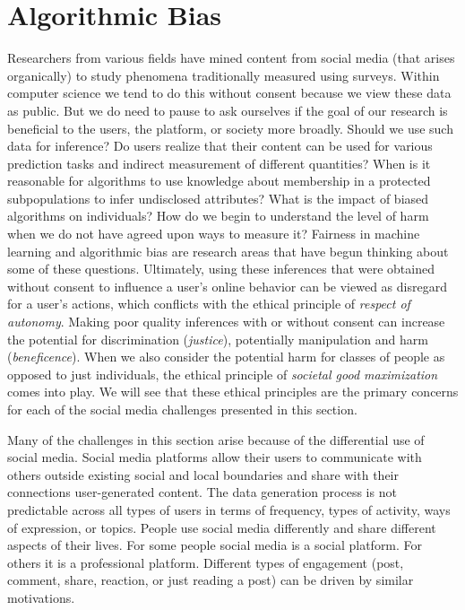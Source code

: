 \documentclass[11pt]{article} %
\begin{document}
\section{Algorithmic Bias}
\label{sec:bias} 

Researchers from various fields have mined content from social media (that arises organically) to study phenomena traditionally measured using surveys. Within computer science we tend to do this without consent because we view these data as public. But we do need to pause to ask ourselves if the goal of our research is beneficial to the users, the platform, or society more broadly. Should we use such data for inference? Do users realize that their content can be used for various prediction tasks and indirect measurement of different quantities? When is it reasonable for algorithms to use knowledge about membership in a protected subpopulations to infer undisclosed attributes? What is the impact of biased algorithms on individuals? How do we begin to understand the level of harm when we do not have agreed upon ways to measure it? Fairness in machine learning and algorithmic bias are research areas that have begun thinking about some of these questions. Ultimately, using these inferences that were obtained without consent to influence a user's online behavior can be viewed as disregard for a user's actions, which conflicts with the ethical principle of \textit{respect of autonomy}. Making poor quality inferences with or without consent can increase the potential for discrimination (\textit{justice}), potentially manipulation and harm (\textit{beneficence}). When we also consider the potential harm for classes of people as opposed to just individuals, the ethical principle of \textit{societal good maximization} comes into play. We will see that these ethical principles are the primary concerns for each of the social media challenges presented in this section.

Many of the challenges in this section arise because of the differential use of social media. Social media platforms allow their users to communicate with others outside existing social and local boundaries and share with their connections user-generated content. The data generation process is not predictable across all types of users in terms of frequency, types of activity, ways of expression, or topics. People use social media differently and share different aspects of their lives. For some people social media is a social platform. For others it is a professional platform. Different types of engagement (post, comment, share, reaction, or just reading a post) can be driven by similar motivations.  
\end{document}
